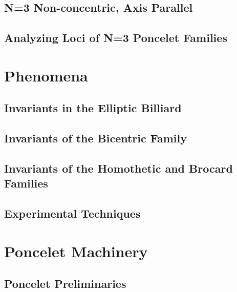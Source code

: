 \documentclass{book}
\begin{document}
\chapter{N=3 Non-concentric, Axis Parallel}
\label{chap:03-n3-ncap}


\chapter{Analyzing Loci of N=3 Poncelet Families}
\label{chap:04-n3-loci}


\part{ Phenomena}

\chapter[Billiard Invariants]{Invariants in the Elliptic Billiard}
\label{chap:05-billiard}

\chapter[Bicentric Invariants]{Invariants of the Bicentric Family}
\label{chap:06-bicentric}
%

\chapter[Homothetic and Brocard Invariants]{Invariants of the Homothetic and Brocard Families}
\label{chap:07-homoth}
%

\chapter{Experimental Techniques}
\label{chap:08-experimental}
%

\part{Poncelet Machinery}

\chapter{Poncelet Preliminaries}
\label{chap:02-poncelet-prelims}

\end{document}
